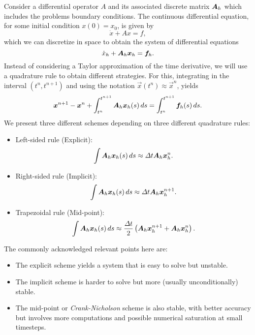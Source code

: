 Consider a differential operator $A$ and its associated discrete matrix $\mat A_h$ which includes the problems boundary conditions. The continuous differential equation, for some initial condition $x(0) = x_0$, is given by 
\begin{equation}
    \dot x + A x = f,
\end{equation}
which we can discretize in space to obtain the system of differential equations
\begin{equation}
    \dot x_h + \mat A_h \vec x_h = \vec f_h.
\end{equation}
Instead of considering a Taylor approximation of the time derivative, we will use a quadrature rule to obtain different strategies. For this, integrating in the interval $(t^n, t^{n+1})$ and using the notation $\vec x(t^n) \approx \vec x^{n}$, yields
\begin{equation}
    \vec x^{n+1} - \vec x^n + \int_{t^n}^{t^{n+1}} \mat A_h \vec x_h(s) \,ds = \int_{t^n}^{t^{n+1}} \vec f_h(s)\,ds.
\end{equation}
We present three different schemes depending on three different quadrature rules: 
\begin{itemize}
    \item Left-sided rule (Explicit):
        \begin{equation}
            \int \mat A_h \vec x_h(s)\,ds \approx \Delta t \mat A_h\vec x_h^n.
        \end{equation}
    \item Right-sided rule (Implicit): 
        \begin{equation}
            \int \mat A_h \vec x_h(s)\,ds \approx \Delta t\mat A_h\vec x_h^{n+1}.
        \end{equation}
    \item Trapezoidal rule (Mid-point): 
        \begin{equation}
            \int \mat A_h \vec x_h(s)\,ds \approx \frac{\Delta t}{2}\left(\mat A_h\vec x_h^{n+1}+ \mat A_h \vec x_h^n\right).
        \end{equation}
    \end{itemize}
    The commonly acknowledged relevant points here are: 
    \begin{itemize}
        \item The explicit scheme yields a system that is easy to solve but unstable.
        \item The implicit scheme is harder to solve but more (usually unconditionally) stable.
        \item The mid-point or \emph{Crank-Nicholson} scheme is also stable, with better accuracy but involves more computations and possible numerical saturation at small timesteps.
    \end{itemize}
